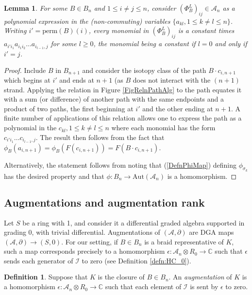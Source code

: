 \documentclass{amsart}[11pt,fullpage]
\def\C{{\mathbb C}}
\def\A{{\mathcal A}}
\def\s{{\sigma}}
\newtheorem{lem}[thm]{Lemma}
\theoremstyle{definition}
\newtheorem{defn}[thm]{Definition}
\begin{document}
  \begin{lem} For some $B\in B_n$ and $1\le i\ne j\le n$, consider $(\Phi_B^L)_{ij}\in \A_n$ as a polynomial expression in the (non-commuting) variables $\{a_{kl}, 1\le k\ne l\le n\}$. Writing $i'=\text{perm}(B)(i)$, every monomial in $(\Phi_B^L)_{ij}$ is a constant times $a_{i'i_1}a_{i_1i_2}\ldots a_{i_{l-1},j}$ for some $l\ge 0$, the monomial being a constant if $l=0$ and only if $i'=j$.
  \label{lem:monomial}
  \end{lem}
  \begin{proof}Include $B$ in $B_{n+1}$ and consider the isotopy class of the path $B\cdot c_{i,n+1}$ which begins at $i'$ and ends at $n+1$ (as $B$ does not interact with the $(n+1)$ strand. Applying the relation in Figure \ref{FigRelnPathAlg} to the path equates it with a sum (or difference) of another path with the same endpoints and a product of two paths, the first beginning at $i'$ and the other ending at $n+1$. A finite number of applications of this relation allows one to express the path as a polynomial in the $c_{kl}, 1\le k\ne l\le n$ where each monomial has the form $c_{i'i_1}\ldots c_{i_{l-1},j}$. The result then follows from the fact that $\phi_B(a_{i,n+1}) = \phi_B(F(c_{i,n+1})) = F(B\cdot c_{i,n+1})$.

  Alternatively, the statement follows from noting that (\ref{DefnPhiMap}) defining $\phi_{\s_k}$ has the desired property and that $\phi:B_n\to\text{Aut}(\A_n)$ is a homomorphism.
  \end{proof}

\subsection{Augmentations and augmentation rank}
\label{SecBG_AugRk}

  Let $S$ be a ring with 1, and consider it a differential graded algebra supported in grading 0, with trivial differential. Augmentations of $(\A,\partial)$ are DGA maps $(\A,\partial)\to (S,0)$. For our setting, if $B\in B_n$ is a braid representative of $K$, such a map corresponds precisely to a homomorphism $\epsilon:\A_n\otimes R_0\to\C$ such that $\epsilon$ sends each generator of $\mathcal I$ to zero (see Definition \ref{defn:HC_0}).

  \begin{defn}
  Suppose that $K$ is the closure of $B\in B_n$. An \emph{augmentation} of $K$ is a homomorphism $\epsilon: \A_n\otimes R_0\rightarrow \C$ such that each element of $\mathcal I$ is sent by $\epsilon$ to zero.
  \label{defn:Aug}
  \end{defn}
\end{document}
